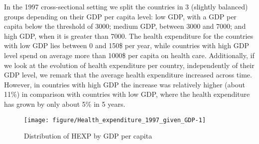 \documentclass[12pt,a4paper]{article}\usepackage[]{graphicx}\usepackage[]{color}
\begin{document}

In the 1997 cross-sectional setting we split the countries in 3 (slightly balanced) groups depending on their GDP per capita level: low GDP, with a GDP per capita below the threshold of 3000; medium GDP, between 3000 and 7000; and high GDP, when it is greater than 7000.  
The health expenditure for the countries with low GDP lies between 0 and 150\$ per year, while countries with  high GDP level spend on average more than 1000\$ per capita on health care.  Additionally, if we look at the evolution of health expenditure per country, independently of their GDP level, we remark that the average health expenditure increased across time. However, in countries with high GDP the increase was relatively higher (about 11\%) in comparison with countries with low GDP, where the health expenditure has grown by only about 5\% in 5 years.

\begin{figure}[!htbp]

{\centering \texttt{[image: figure/Health\_expenditure\_1997\_given\_GDP-1]} 

}

\caption[Distribution of HEXP by GDP per capita]{Distribution of HEXP by GDP per capita}\label{fig:Health expenditure 1997 given GDP}
\end{figure}
\end{document}
